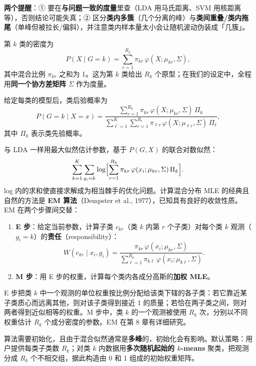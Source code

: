 \textbf{两个提醒}：① 要在\textbf{与问题一致的度量}里查（LDA 用马氏距离、SVM 用核距离等），否则结论可能失真；② 区分\textbf{类内多簇}（几个分离的峰）与\textbf{类间重叠/类内拖尾}（单峰但被拉长/偏斜），并注意类内样本量太小会让随机波动伪装成「几簇」。

\begin{definition}[高斯混合模型]
第 $k$ 类的密度为
\begin{equation}
P(X\mid G=k) = \sum_{r=1}^{R_k}\pi_{kr}\,\varphi(X;\mu_{kr},\Sigma), \label{eq:12_59}
\end{equation}
其中混合比例 $\pi_{kr}$ 之和为 1。这为第 $k$ 类给出 $R_k$ 个原型；在我们的设定中，全程用\textbf{同一个协方差矩阵} $\Sigma$ 作为度量。
\end{definition}

给定每类的模型后，类后验概率为
\begin{equation}
P(G=k\mid X=x) = \frac{\sum_{r=1}^{R_k}\pi_{kr}\,\varphi(X;\mu_{kr},\Sigma)\,\Pi_k}{\sum_{\ell=1}^{K}\sum_{r=1}^{R_\ell}\pi_{\ell r}\,\varphi(X;\mu_{\ell r},\Sigma)\,\Pi_\ell}, \label{eq:12_60}
\end{equation}
其中 $\Pi_k$ 表示类先验概率。

与 LDA 一样用最大似然估计参数，基于 $P(G,X)$ 的联合对数似然：
\begin{equation}
\sum_{k=1}^{K}\sum_{g_i=k}\log\Bigl[\sum_{r=1}^{R_k}\pi_{kr}\,\varphi(x_i;\mu_{kr},\Sigma)\,\Pi_k\Bigr]. \label{eq:12_61}
\end{equation}
log 内的求和使直接求解成为相当棘手的优化问题。计算混合分布 MLE 的经典且自然的方法是 \textbf{EM 算法}（Dempster et al., 1977），已知具有良好的收敛性质。EM 在两个步骤间交替：

\begin{enumerate}
\item \textbf{E 步}：给定当前参数，计算子类 $c_{kr}$（类 $k$ 内第 $r$ 个子类）对每个类 $k$ 观测（$g_i=k$）的\textbf{责任}（responsibility）：
\begin{equation}
W(c_{kr}\mid x_i,g_i) = \frac{\pi_{kr}\,\varphi(x_i;\mu_{kr},\Sigma)}{\sum_{\ell=1}^{R_k}\pi_{k\ell}\,\varphi(x_i;\mu_{k\ell},\Sigma)}. \label{eq:12_62}
\end{equation}
\item \textbf{M 步}：用 E 步的权重，计算每个类内各成分高斯的\textbf{加权 MLE}。
\end{enumerate}

\begin{remark}[EM 的解释与初始化]
E 步把类 $k$ 中一个观测的单位权重按比例分配给该类下辖的各子类：若它靠近某子类质心而远离其他，则对该子类得到接近 1 的质量；若恰在两子类之间，则对两者得到近似相等的权重。M 步中，类 $k$ 的一个观测被使用 $R_k$ 次，分别以不同权重估计 $R_k$ 个成分密度的参数。EM 在第 8 章有详细研究。

算法需要初始化，且由于混合似然通常是\textbf{多峰}的，初始化会有影响。默认策略：用户提供每类子类数 $R_k$；对类 $k$ 内数据用\textbf{多次随机起始的 $k$-means} 聚类，把观测分成 $R_k$ 个不相交组，据此构造由 0 和 1 组成的初始权重矩阵。
\end{remark}

